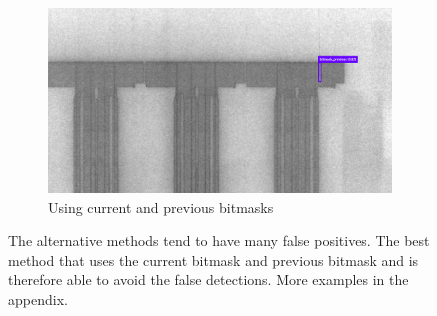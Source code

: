 \begin{figure}[!h]
\begin{subfigure}{.9\textwidth}
  \centering
  \includegraphics[width=\linewidth]{images/implementation/results/bm/bm_prev}
  \caption{Using current and previous bitmasks}
\end{subfigure}
\caption{The alternative methods tend to have many false positives. The best method that uses the current bitmask and previous bitmask and is therefore able to avoid the false detections. More examples in the appendix.}
\label{app:bm_compare_ext_1}
\end{figure}


